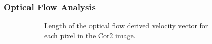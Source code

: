 \subsubsection{Optical Flow Analysis} \label{contributions:astro:spaceweather:opticalflow}
\begin{figure}
\centering
\begin{subfigure}[b]{0.32\textwidth}
    \caption{Length of the optical flow derived velocity vector for each pixel in the Cor2 image.}
    \label{contributions:astro:spaceweather:velocity:opticalflow}
\end{subfigure}
\hspace*{1cm}
\begin{subfigure}[b]{0.32\textwidth}

\end{subfigure}
\end{figure}
